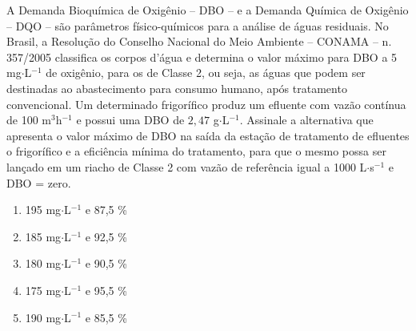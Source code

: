 A Demanda Bioquímica de Oxigênio -- DBO -- e a Demanda Química de Oxigênio -- DQO -- são parâmetros físico-químicos para a análise de águas residuais.
No Brasil, a Resolução do Conselho Nacional do Meio Ambiente -- CONAMA -- n. 357/2005 classifica os corpos d'água e determina o valor máximo para DBO a 5 mg$\cdot$L$^{-1}$ de oxigênio, para os de Classe 2, ou seja, as águas que podem ser destinadas ao abastecimento para consumo humano, após tratamento convencional.
Um determinado frigorífico produz um efluente com vazão contínua de 100 m$^3$h$^{-1}$ e possui uma DBO de $2,47$ g$\cdot$L$^{-1}$.
Assinale a alternativa que apresenta o valor máximo de DBO na saída da estação de tratamento de efluentes o frigorífico e a eficiência mínima do tratamento, para que o mesmo possa ser lançado em um riacho de Classe 2 com vazão de referência igual a 1000 L$\cdot$s$^{-1}$ e DBO = zero.

\begin{enumerate}[label = (\alph*)]
	\item 195 mg$\cdot$L$^{-1}$ e 87,5 \%
	\item 185 mg$\cdot$L$^{-1}$ e 92,5 \%
	\item 180 mg$\cdot$L$^{-1}$ e 90,5 \%
	\item 175 mg$\cdot$L$^{-1}$ e 95,5 \%
	\item 190 mg$\cdot$L$^{-1}$ e 85,5 \%
\end{enumerate}

